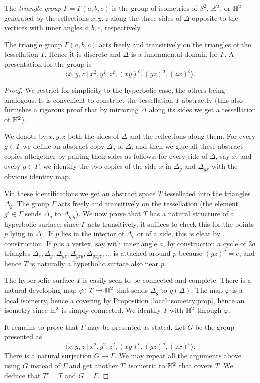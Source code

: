 The \emph{triangle group} $\Gamma = \Gamma (a,b,c)$ is the group of isometries of $S^2$, $\mathbb{R}^2$, or $\mathbb{H}^2$ generated by the reflections $x,y,z$ along the three sides of $\Delta$ opposite to the vertices with inner angles $a,b,c$, respectively.

\begin{prop} \label{triangle:gamma:prop}
The triangle group $\Gamma (a,b,c)$ acts freely and transitively on the triangles of the tessellation $T$. Hence it is discrete and $\Delta$ is a fundamental domain for $\Gamma$. A presentation for the group is
$$\langle x, y,z\ |\ x^2, y^2, z^2, (xy)^c, (yz)^a, (zx)^b \rangle.$$
\end{prop}
\begin{proof}
We restrict for simplicity to the hyperbolic case, the others being analogous. It is convenient to construct the tessellation $T$ abstractly (this also furnishes a rigorous proof that by mirroring $\Delta$ along its sides we get a tessellation of $\mathbb{H}^2$). 

We denote by $x,y,z$ both the sides of $\Delta$ and the reflections along them. For every $g\in \Gamma$ we define an abstract copy $\Delta_g$ of $\Delta$, and then we glue all these abstract copies altogether by pairing their sides  as follows: for every side of $\Delta$, say $x$, and every $g\in \Gamma$, we identify the two copies of the side $x$ in $\Delta_g$ and $\Delta_{gx}$ with the obvious identity map.

Via these identifications we get an abstract space $T$ tessellated into the triangles $\Delta_g$. The group $\Gamma$ acts freely and transitively on the tessellation (the element $g'\in \Gamma$ sends $\Delta_g$ to $\Delta_{g'g}$). We now prove that $T$ has a natural structure of a hyperbolic surface: since $\Gamma$ acts transitively, it suffices to check this for the points $p$ lying in $\Delta_e$. If $p$ lies in the interior of $\Delta_e$ or of a side, this is clear by construction. If $p$ is a vertex, say with inner angle $a$, by construction a cycle of $2a$ triangles $\Delta_e, \Delta_y, \Delta_{yz}, \Delta_{yzy}, \Delta_{yzyz}, \ldots $ is attached around $p$ because $(yz)^a = e$, and hence $T$ is naturally a hyperbolic surface also near $p$.

The hyperbolic surface $T$ is easily seen to be connected and complete. There is a natural developing map $\varphi\colon T\to \mathbb{H}^2$ that sends $\Delta_g$ to $g(\Delta)$. The map $\varphi$ is a local isometry, hence a covering by Proposition \ref{local:isometry:prop}, hence an isometry since $\mathbb{H}^2$ is simply connected. We identify $T$ with $\mathbb{H}^2$ through $\varphi$.

It remains to prove that $\Gamma$ may be presented as stated. Let $G$ be the group presented as
$$\langle x, y,z\ |\ x^2, y^2, z^2, (xy)^c, (yz)^a, (zx)^b \rangle.$$
There is a natural surjection $G\to \Gamma$. We may repeat all the arguments above using $G$ instead of $\Gamma$ and get another $T'$ isometric to $\mathbb{H}^2$ that covers $T$. We deduce that $T'=T$ and $G=\Gamma$.
\end{proof}


